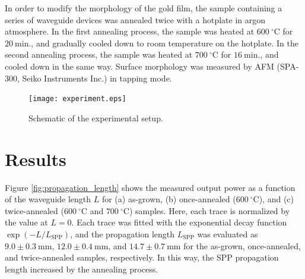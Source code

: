 \documentclass[aip,apl,reprint]{revtex4-1}
\begin{document}
In order to modify the morphology of the gold film, the sample containing a series of waveguide devices was annealed twice with a hotplate in argon atmosphere\cite{Nogues}.
In the first annealing process, the sample was heated at $600\:^\circ\mathrm{C}$ for $20\:\mathrm{min}$., and gradually cooled down to room temperature on the hotplate. In the second annealing process, the sample was heated at $700\:^\circ\mathrm{C}$ for $16\:\mathrm{min}$., and cooled down in the same way. Surface morphology was measured by AFM (SPA-300, Seiko Instruments Inc.) in tapping mode.

 \begin{figure}
    \texttt{[image: experiment.eps]}
    \caption{Schematic of the experimental setup.}
     \label{fig:experiment}
\end{figure}

\section{Results}
\label{sec:result}
Figure \ref{fig:propagation_length} shows the measured output power as a function of the waveguide length $L$ for (a) as-grown, (b) once-annealed ($600\:^\circ\mathrm{C}$), and (c) twice-annealed ($600\:^\circ\mathrm{C}$ and $700\:^\circ\mathrm{C}$) samples.
Here, each trace is normalized by the value at $L=0$.
Each trace was fitted with the exponential decay function $\exp(-L/L_{\mathrm{SPP}})$, and the propagation length $L_{\mathrm{SPP}}$ was evaluated as $9.0\pm0.3\:\mathrm{mm}$, $12.0\pm0.4\:\mathrm{mm}$, and $14.7\pm0.7\:\mathrm{mm}$ for the as-grown, once-annealed, and twice-annealed samples, respectively.
In this way, the SPP propagation length increased by the annealing process.
\end{document}

